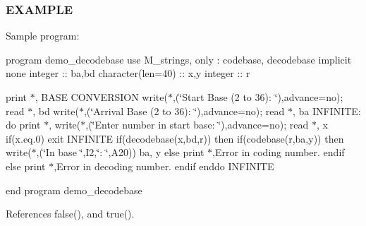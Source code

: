 \subsubsection*{E\+X\+A\+M\+P\+LE}

Sample program\+:

program demo\+\_\+decodebase use M\+\_\+strings, only \+: codebase, decodebase implicit none integer \+:\+: ba,bd character(len=40) \+:\+: x,y integer \+:\+: r

print $\ast$,\textquotesingle{} B\+A\+SE C\+O\+N\+V\+E\+R\+S\+I\+ON\textquotesingle{} write($\ast$,\textquotesingle{}(\char`\"{}\+Start   Base (2 to 36)\+: \char`\"{})\textquotesingle{},advance=\textquotesingle{}no\textquotesingle{}); read $\ast$, bd write($\ast$,\textquotesingle{}(\char`\"{}\+Arrival Base (2 to 36)\+: \char`\"{})\textquotesingle{},advance=\textquotesingle{}no\textquotesingle{}); read $\ast$, ba I\+N\+F\+I\+N\+I\+TE\+: do print $\ast$,\textquotesingle{}\textquotesingle{} write($\ast$,\textquotesingle{}(\char`\"{}\+Enter number in start base\+: \char`\"{})\textquotesingle{},advance=\textquotesingle{}no\textquotesingle{}); read $\ast$, x if(x.\+eq.\textquotesingle{}0\textquotesingle{}) exit I\+N\+F\+I\+N\+I\+TE if(decodebase(x,bd,r)) then if(codebase(r,ba,y)) then write($\ast$,\textquotesingle{}(\char`\"{}\+In base \char`\"{},I2,\char`\"{}\+: \char`\"{},A20)\textquotesingle{}) ba, y else print $\ast$,\textquotesingle{}Error in coding number.\textquotesingle{} endif else print $\ast$,\textquotesingle{}Error in decoding number.\textquotesingle{} endif enddo I\+N\+F\+I\+N\+I\+TE

end program demo\+\_\+decodebase 

References false(), and true().

\mbox{\label{namespacem__strings_a9890da826d63d6f04367887007611cb5}} 
